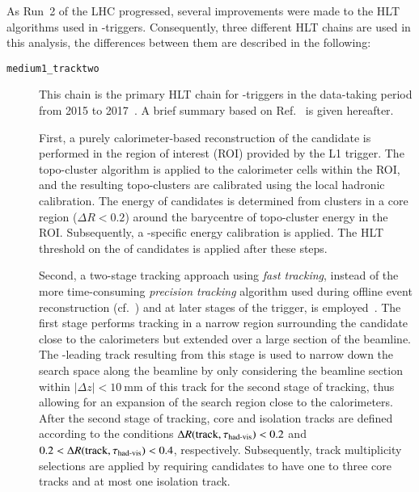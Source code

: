As Run~2 of the LHC progressed, several improvements were made to the HLT
algorithms used in \tauhadvis-triggers. Consequently, three different HLT chains
are used in this analysis, the differences between them are described in the
following:
\begin{description}

\item[\texttt{medium1\_tracktwo}] This chain is the primary HLT chain for
  \tauhadvis-triggers in the data-taking period from 2015 to
  2017~\cite{ATL-DAQ-PUB-2016-001,ATL-DAQ-PUB-2017-001,ATL-DAQ-PUB-2018-002}. A
  brief summary based on Ref.~\cite{ATLAS-CONF-2017-061} is given hereafter.

  First, a purely calorimeter-based reconstruction of the \tauhadvis candidate
  is performed in the region of interest (ROI) provided by the L1 trigger. The
  topo-cluster algorithm is applied to the calorimeter cells within the ROI, and
  the resulting topo-clusters are calibrated using the local hadronic
  calibration. The energy of \tauhadvis candidates is determined from clusters
  in a core region ($\Delta R < 0.2$) around the barycentre of topo-cluster
  energy in the ROI. Subsequently, a \tauhadvis-specific energy calibration is
  applied.
  The HLT threshold on the \pT of \tauhadvis candidates is applied after these
  steps.

  Second, a two-stage tracking approach using \emph{fast tracking}, instead of
  the more time-consuming \emph{precision tracking} algorithm used during
  offline event reconstruction (cf.~) and at
  later stages of the trigger, is
  employed~\cite{TRIG-2016-01,ATLAS-CONF-2017-061,TRIG-2019-03}.
  The first stage performs tracking in a narrow region surrounding the
  \tauhadvis candidate close to the calorimeters but extended over a large
  section of the beamline. The \pT-leading track resulting from this stage is
  used to narrow down the search space along the beamline by only considering
  the beamline section within $|\Delta z| < \SI{10}{\milli\metre}$ of this track
  for the second stage of tracking, thus allowing for an expansion of the search region
  close to the calorimeters. After the second
  stage of tracking, core and isolation tracks are defined according to the
  conditions $\Delta R(\text{track}, \tau_{\text{had-vis}}) < 0.2$ and
  $0.2 < \Delta R(\text{track}, \tau_{\text{had-vis}}) < 0.4$, respectively. Subsequently,
  track multiplicity selections are applied by requiring \tauhadvis candidates
  to have one to three core tracks and at most one isolation track.


\end{description}
